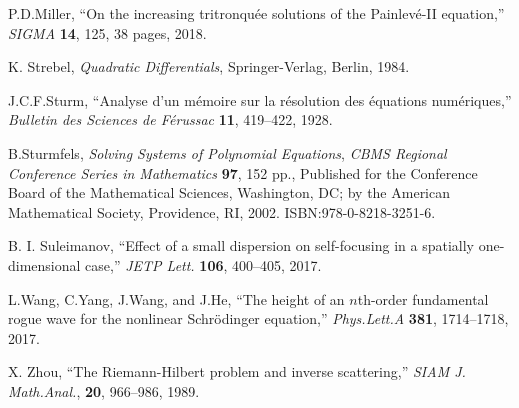 \documentclass[11pt]{amsart}
\theoremstyle{definition}
\theoremstyle{remark}
\begin{document}
\begin{thebibliography}{99}
 P.\@ D.\@ Miller, ``On the increasing tritronqu\'ee solutions of the Painlev\'e-II equation,'' \textit{SIGMA} \textbf{14}, 125, 38 pages, 2018.

 K. Strebel, \textit{Quadratic Differentials}, Springer-Verlag, Berlin, 1984.

J.\@ C.\@ F.\@ Sturm, ``Analyse d'un m\'emoire sur la r\'esolution des \'equations num\'eriques,'' \textit{Bulletin des Sciences de F\'erussac} \textbf{11}, 419--422, 1928.

B.\@ Sturmfels, \textit{Solving Systems of Polynomial Equations}, \textit{CBMS Regional Conference Series in Mathematics} \textbf{97}, 152 pp., Published for the Conference Board of the Mathematical Sciences, Washington, DC; by the American Mathematical Society, Providence, RI, 2002. ISBN:978-0-8218-3251-6.

B. I. Suleimanov, ``Effect of a small dispersion on self-focusing in a spatially one-dimensional case,''
\textit{JETP Lett.\@} \textbf{106}, 400--405, 2017.

L.\@ Wang, C.\@ Yang, J.\@ Wang, and J.\@ He, ``The height of an $n$th-order fundamental rogue wave for the nonlinear Schr\"odinger equation,'' \textit{Phys.\@ Lett.\@ A} \textbf{381},  1714--1718, 2017.

X. Zhou, ``The Riemann-Hilbert problem and inverse scattering,'' \textit{SIAM J. Math.\@ Anal.\@}, \textbf{20}, 966--986, 1989.
\end{thebibliography}
\end{document}
